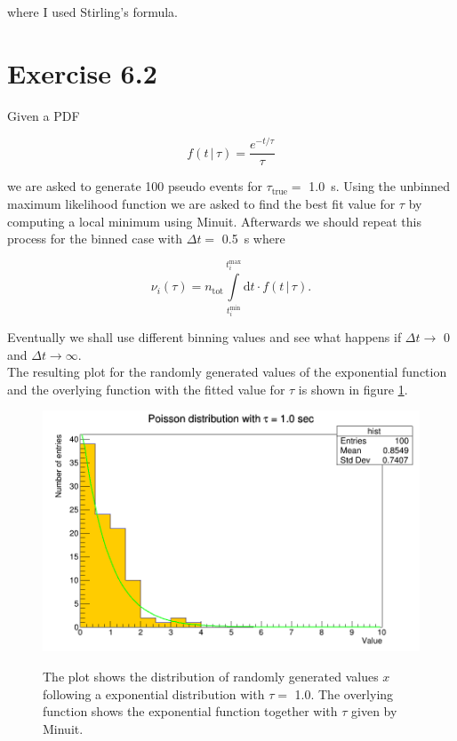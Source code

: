 \documentclass[10pt]{article}
\newenvironment{myfont}{\fontfamily{put}\selectfont}{\par}
\begin{document}
\begin{myfont}
\noindent where I used Stirling's formula.


\section*{Exercise 6.2}

\noindent Given a PDF 

\begin{equation}
f(t\, | \, \tau) = \frac{e^{-t/\tau}}{\tau}
\end{equation}

\noindent we are asked to generate \num{100} pseudo events for $\tau_{\textrm{true}} =$ \SI{1.0}{\second}.
Using the unbinned maximum likelihood function we are asked to find the best fit value for $\tau$ by computing a local minimum using Minuit.
Afterwards we should repeat this process for the binned case with $\Delta t =$ \SI{0.5}{\second} where

\begin{equation}
\nu_{i}(\tau) = n_{\textrm{tot}} \int\limits_{t_{i}^{\textrm{min}}}^{t_{i}^{\textrm{max}}} \textrm{d}t \cdot f(t\, | \, \tau).
\end{equation}

\noindent Eventually we shall use different binning values and see what happens if $\Delta t \rightarrow $ \num{0} and $\Delta t \rightarrow \infty$. \\

\noindent The resulting plot for the randomly generated values of the exponential function and the overlying function with the fitted value for $\tau$ is shown in figure \ref{fig:ex6_2}.

\begin{figure}[H]
	\centering
	\caption{The plot shows the distribution of randomly generated values $x$ following a exponential distribution with $\tau =$ \num{1.0}.
	The overlying function shows the exponential function together with $\tau$ given by Minuit.}
	\includegraphics[width = \textwidth]{exercise6_2.png}
	\label{fig:ex6_2}
\end{figure}

\end{myfont}
\end{document}
